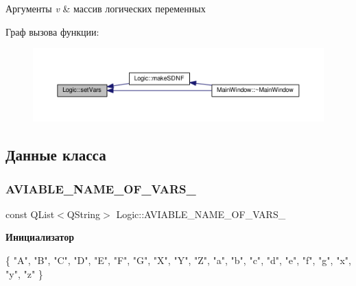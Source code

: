 \begin{DoxyParams}{Аргументы}
{\em v} & массив логических переменных \\
\hline
\end{DoxyParams}
Граф вызова функции\+:\nopagebreak
\begin{figure}[H]
\begin{center}
\leavevmode
\includegraphics[width=350pt]{class_logic_af592736369fd989be41c59b4e7315ab5_icgraph}
\end{center}
\end{figure}


\subsection{Данные класса}
\mbox{\label{class_logic_a5d00b20d2c2a531f8796581f49fa7d5a}} 
\subsubsection{\texorpdfstring{A\+V\+I\+A\+B\+L\+E\+\_\+\+N\+A\+M\+E\+\_\+\+O\+F\+\_\+\+V\+A\+R\+S\+\_\+}{AVIABLE\_NAME\_OF\_VARS\_}}
{\footnotesize\ttfamily const Q\+List$<$Q\+String$>$ Logic\+::\+A\+V\+I\+A\+B\+L\+E\+\_\+\+N\+A\+M\+E\+\_\+\+O\+F\+\_\+\+V\+A\+R\+S\+\_\+}

{\bfseries Инициализатор}
\begin{DoxyCode}
\{
        \textcolor{stringliteral}{"A"}, \textcolor{stringliteral}{"B"}, \textcolor{stringliteral}{"C"}, \textcolor{stringliteral}{"D"}, \textcolor{stringliteral}{"E"}, \textcolor{stringliteral}{"F"}, \textcolor{stringliteral}{"G"}, \textcolor{stringliteral}{"X"}, \textcolor{stringliteral}{"Y"}, \textcolor{stringliteral}{"Z"},
        \textcolor{stringliteral}{"a"}, \textcolor{stringliteral}{"b"}, \textcolor{stringliteral}{"c"}, \textcolor{stringliteral}{"d"}, \textcolor{stringliteral}{"e"}, \textcolor{stringliteral}{"f"}, \textcolor{stringliteral}{"g"}, \textcolor{stringliteral}{"x"}, \textcolor{stringliteral}{"y"}, \textcolor{stringliteral}{"z"}
    \}
\end{DoxyCode}


